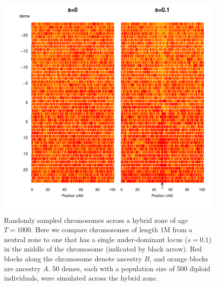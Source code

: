\documentclass[11pt,letterpaper]{article}
\begin{document}



\begin{figure}
\includegraphics[width=\textwidth]{figs/plot_chromosomes_tau1000}
\caption{Randomly sampled chromosomes  across a hybrid zone of age $T=1000$. Here we compare chromosomes of length 1M from a neutral zone to one that has a single under-dominant locus ($s=0.1$) in the middle of the chromosome (indicated by black arrow). Red blocks along the chromosome denote ancestry $B$, and orange blocks are ancestry $A$. 
    50 demes, each with a population size of 500 diploid individuals, were simulated across the hybrid zone.
}\label{Fig:resistanceToIntrogression1000g}
\end{figure}
\end{document}
